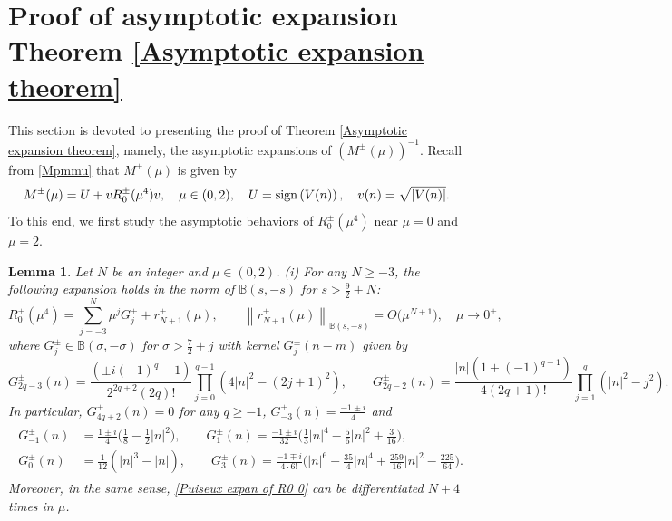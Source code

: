 \documentclass[reqno, 11pt]{amsart}
\newtheorem{lemma}[definition]{Lemma}
\newcommand\B{\mathbb{B}}
\numberwithin{equation}{section}
\begin{document}
\section{Proof of asymptotic expansion Theorem \ref{Asymptotic expansion theorem}}\label{proof of Asy theorem}
This section is devoted to presenting the proof of Theorem \ref{Asymptotic expansion theorem}, namely, the asymptotic expansions of $(M^{\pm}(\mu))^{-1}$. Recall from \eqref{Mpmmu} that $M^{\pm}(\mu)$ is given by
\begin{equation*}
M^{\pm}(\mu)=U+vR^{\pm}_{0}(\mu^4)v,\quad\mu\in(0,2),\quad U={\rm sign}\left(V(n)\right),\quad v(n)=\sqrt{|V(n)|}.
\end{equation*}
To this end, we first study the asymptotic behaviors of $R^{\pm}_{0}(\mu^4)$ near $\mu=0$ and $\mu=2$.
\begin{lemma}\label{Puiseux expan of R0}
Let $N$ be an integer and $\mu\in(0,2)$. 
\vskip0.1cm
{\rm (i)} For any $N\geq-3$, the following expansion holds in the norm of $\B(s,-s)$ for $s>\frac{9}{2}+N$:
\begin{equation}\label{Puiseux expan of R0 0}
R^{\pm}_0(\mu^4)=\sum\limits_{j=-3}^{N}\mu^{j}G^{\pm}_j+r^{\pm}_{N+1}(\mu),\qquad \left\|r^{\pm}_{N+1}(\mu)\right\|_{\B(s,-s)}=O\big(\mu^{N+1}\big),\quad\mu\rightarrow0^+,
\end{equation}
where $G^{\pm}_j\in\B(\sigma,-\sigma)$ for $\sigma>\frac{7}{2}+j$ with kernel $G^{\pm}_j(n-m)$ given by 
\begin{equation*}
   G^{\pm}_{2q-3}(n)= \frac{(\pm i(-1)^q-1)}{2^{2q+2}(2q)!}\prod\limits_{j=0}^{q-1}(4|n|^2-(2j+1)^2),\qquad  G^\pm_{2q-2}(n)=\frac{|n|(1+(-1)^{q+1})}{4(2q+1)!}\prod\limits_{j=1}^{q}(|n|^2-j^2).
\end{equation*}
In particular, $G^{\pm}_{4q+2}(n)=0$ for any $q\geq-1$, $G^{\pm}_{-3}(n)=\frac{-1\pm i}{4}$ and 
\begin{align}\label{expan coeffie of Gpm}
\begin{split}
  G^{\pm}_{-1}(n)&=\frac{1\pm i}{4}\big(\frac{1}{8}-\frac{1}{2}|n|^2\big), \qquad G^{\pm}_{1}(n)=\frac{-1\pm i}{32}\big(\frac{1}{3}|n|^4-\frac{5}{6}|n|^2+\frac{3}{16}\big), \\
 G^{\pm}_{0}(n)&=\frac{1}{12}\left(|n|^3-|n|\right), \qquad G^{\pm}_{3}(n)=\frac{-1\mp i}{4\cdot6!}\big(|n|^6-\frac{35}{4}|n|^4+\frac{259}{16}|n|^2-\frac{225}{64}\big).
\end{split}
\end{align}
Moreover, in the same sense, \eqref{Puiseux expan of R0 0} can be differentiated $N+4$ times in $\mu$.

\end{lemma}
\end{document}
